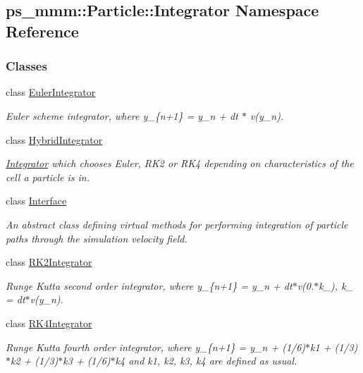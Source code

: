 \hypertarget{namespaceps__mmm_1_1_particle_1_1_integrator}{}\subsection{ps\+\_\+mmm\+:\+:Particle\+:\+:Integrator Namespace Reference}
\label{namespaceps__mmm_1_1_particle_1_1_integrator}
\subsubsection*{Classes}
\begin{DoxyCompactItemize}
\item 
class \hyperlink{classps__mmm_1_1_particle_1_1_integrator_1_1_euler_integrator}{Euler\+Integrator}
\begin{DoxyCompactList}\small\item\em Euler scheme integrator, where y\+\_\+\{n+1\} = y\+\_\+n + dt $\ast$ v(y\+\_\+n). \end{DoxyCompactList}\item 
class \hyperlink{classps__mmm_1_1_particle_1_1_integrator_1_1_hybrid_integrator}{Hybrid\+Integrator}
\begin{DoxyCompactList}\small\item\em \hyperlink{namespaceps__mmm_1_1_particle_1_1_integrator}{Integrator} which chooses Euler, R\+K2 or R\+K4 depending on characteristics of the cell a particle is in. \end{DoxyCompactList}\item 
class \hyperlink{classps__mmm_1_1_particle_1_1_integrator_1_1_interface}{Interface}
\begin{DoxyCompactList}\small\item\em An abstract class defining virtual methods for performing integration of particle paths through the simulation velocity field. \end{DoxyCompactList}\item 
class \hyperlink{classps__mmm_1_1_particle_1_1_integrator_1_1_r_k2_integrator}{R\+K2\+Integrator}
\begin{DoxyCompactList}\small\item\em Runge Kutta second order integrator, where y\+\_\+\{n+1\} = y\+\_\+n + dt$\ast$v(0.$\ast$k\+\_), k\+\_ = dt$\ast$v(y\+\_\+n). \end{DoxyCompactList}\item 
class \hyperlink{classps__mmm_1_1_particle_1_1_integrator_1_1_r_k4_integrator}{R\+K4\+Integrator}
\begin{DoxyCompactList}\small\item\em Runge Kutta fourth order integrator, where y\+\_\+\{n+1\} = y\+\_\+n + (1/6)$\ast$k1 + (1/3)$\ast$k2 + (1/3)$\ast$k3 + (1/6)$\ast$k4 and k1, k2, k3, k4 are defined as usual. \end{DoxyCompactList}\end{DoxyCompactItemize}
